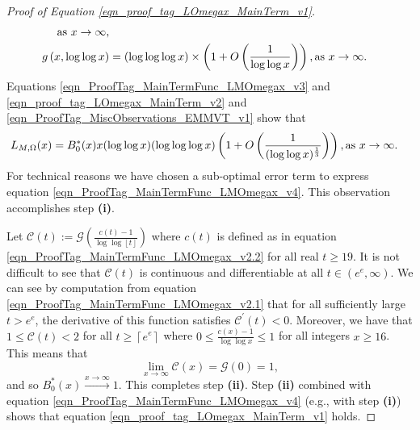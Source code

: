 \documentclass[11pt,reqno,a4letter]{article}
\numberwithin{equation}{section}
\numberwithin{figure}{section}
\numberwithin{table}{section}
\newcommand{\ceiling}[1]{\left\lceil #1 \right\rceil}
\theoremstyle{plain}
\numberwithin{theorem}{section}
\theoremstyle{definition}
\theoremstyle{remark}
\newcommand{\mathtext}[1]{\text{\rm #1}}
\begin{document}
\begin{proof}[Proof of Equation \eqref{eqn_proof_tag_LOmegax_MainTerm_v1}]
\begin{subequations}
\begin{align}
	\mathtext{ as } x \rightarrow \infty, \\ 
g\left(x, \log\log x\right) & = (\log\log\log x) \times 
	\left(1 + O\left(\frac{1}{\log\log x}\right)\right), 
	\mathtext{ as } x \rightarrow \infty. 
\end{align}
\end{subequations}
Equations \eqref{eqn_ProofTag_MainTermFunc_LMOmegax_v3} and 
\eqref{eqn_proof_tag_LOmegax_MainTerm_v2} and 
\eqref{eqn_ProofTag_MiscObservations_EMMVT_v1} show that 
\begin{align}
\label{eqn_ProofTag_MainTermFunc_LMOmegax_v4} 
L_{M,\Omega}(x) & = B_0^{\ast}(x) x (\log\log x) (\log\log\log x) 
     \left(1 + O\left(\frac{1}{(\log\log x)^{\frac{1}{3}}}\right)\right), 
	\mathtext{ as } x \rightarrow \infty. 
\end{align}
For technical reasons we have chosen a sub-optimal error term to express 
equation \eqref{eqn_ProofTag_MainTermFunc_LMOmegax_v4}. 
This observation accomplishes step \textbf{(i)}. 

Let $\mathcal{C}(t) := \mathcal{G}\left(\frac{c(t)-1}{\log\log \left\lfloor t \right\rfloor}\right)$ where 
$c(t)$ is defined as in equation \eqref{eqn_ProofTag_MainTermFunc_LMOmegax_v2.2} 
for all real $t \geq 19$. 
It is not difficult to see that $\mathcal{C}(t)$ is continuous and differentiable at all 
$t \in \left(e^e, \infty\right)$. 
We can see by computation from equation \eqref{eqn_ProofTag_MainTermFunc_LMOmegax_v2.1} that 
for all sufficiently large $t > e^e$, the derivative of this function satisfies 
$\mathcal{C}^{\prime}(t) < 0$. 
Moreover, we have that $1 \leq \mathcal{C}(t) < 2$ for all $t \geq \ceiling{e^e}$ where 
$0 \leq \frac{c(x)-1}{\log\log x} \leq 1$ for all integers $x \geq 16$. 
This means that 
\[
\lim_{x \rightarrow \infty} \mathcal{C}(x) = \mathcal{G}(0) = 1, 
\]
and so $B_0^{\ast}(x) \xrightarrow{x \rightarrow \infty} 1$. 
This completes step \textbf{(ii)}. 
Step \textbf{(ii)} combined with equation \eqref{eqn_ProofTag_MainTermFunc_LMOmegax_v4} 
(e.g., with step \textbf{(i)}) 
shows that equation \eqref{eqn_proof_tag_LOmegax_MainTerm_v1} holds. 
\end{proof}
\end{document}
